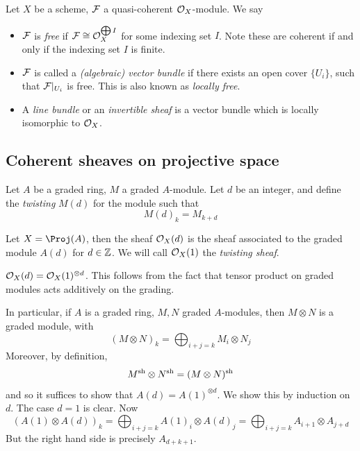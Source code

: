 \documentclass{article}
\begin{document}
\begin{notation}
    Let \(X\) be a scheme, \(\mathcal{F}\) a quasi-coherent \(\mathcal{O}_X\)-module. We say
    \begin{itemize}
        \item \(\mathcal{F}\) is \emph{free} if \(\mathcal{F} \cong \mathcal{O}_X^{\bigoplus I}\) for some indexing set \(I\). Note these are coherent if and only if the indexing set \(I\) is finite.
        \item \(\mathcal{F}\) is called a \emph{(algebraic) vector bundle} if there exists an open cover \(\{U_i\}\), such that \(\mathcal{F}\vert_{U_i}\) is free. This is also known as \emph{locally free}.
        \item A \emph{line bundle} or an \emph{invertible sheaf} is a vector bundle which is locally isomorphic to \(\mathcal{O}_X\).
    \end{itemize}
\end{notation}

\subsection{Coherent sheaves on projective space}

\begin{definition}
    Let \(A\) be a graded ring, \(M\) a graded \(A\)-module. Let \(d\) be an integer, and define the \emph{twisting} \(M(d)\) for the module such that
    \[M(d)_k = M_{k + d}\]

    Let \(X = \Proj(A)\), then the sheaf \(\mathcal{O}_X(d)\) is the sheaf associated to the graded module \(A(d)\) for \(d \in \mathbb{Z}\). We will call \(\mathcal{O}_X(1)\) the \emph{twisting sheaf}.
\end{definition}

\begin{remark}
    \(\mathcal{O}_X(d) = \mathcal{O}_X(1)^{\otimes d}\). This follows from the fact that tensor product on graded modules acts additively on the grading. \begin{addendum}
        In particular, if \(A\) is a graded ring, \(M, N\) graded \(A\)-modules, then \(M \otimes N\) is a graded module, with
        \[(M \otimes N)_k = \bigoplus_{i + j = k}M_i \otimes N_j\]
        Moreover, by definition,
        \[M^{\operatorname{sh}} \otimes N^{\operatorname{sh}} = (M \otimes N)^{\operatorname{sh}}\]
        and so it suffices to show that \(A(d) = A(1)^{\otimes d}\). We show this by induction on \(d\). The case \(d = 1\) is clear. Now
        \[(A(1) \otimes A(d))_k = \bigoplus_{i + j = k}A(1)_i \otimes A(d)_j = \bigoplus_{i + j = k}A_{i+1}\otimes A_{j + d}\]
        But the right hand side is precisely \(A_{d + k + 1}\).
    \end{addendum}
\end{remark}
\end{document}

